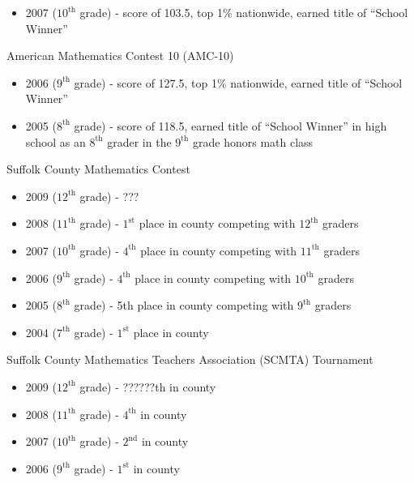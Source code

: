 \documentclass [11pt]{res}
\begin{document}
\begin {itemize}
{\begin{itemize}
          \item
            2007 ($10^\text{th}$ grade) - score of 103.5, top 1\% nationwide, earned title of ``School Winner''
        \end{itemize}
      \item
        American Mathematics Contest 10 (AMC-10)
        \begin{itemize}
          \item
            2006 ($9^\text{th}$ grade) - score of 127.5, top 1\% nationwide, earned title of ``School Winner''
          \item
            2005 ($8^\text{th}$ grade) - score of 118.5, earned title of ``School Winner'' in high school as an $8^\text{th}$ grader in the $9^\text{th}$ grade honors math class
        \end{itemize}
      \item
        Suffolk County Mathematics Contest
        \begin{itemize}
          \item
            2009 ($12^\text{th}$ grade) - ???
          \item
            2008 ($11^\text{th}$ grade) - $1^\text{st}$ place in county competing with $12^\text{th}$ graders
          \item
            2007 ($10^\text{th}$ grade) - $4^\text{th}$ place in county competing with $11^\text{th}$ graders
          \item
            2006 ($9^\text{th}$ grade) - $4^\text{th}$ place in county competing with $10^\text{th}$ graders
          \item
            2005 ($8^\text{th}$ grade) - 5th place in county competing with $9^\text{th}$ graders
          \item
            2004 ($7^\text{th}$ grade) - $1^\text{st}$ place in county
        \end{itemize}
      \item
        Suffolk County Mathematics Teachers Association (SCMTA) Tournament
        \begin{itemize}
          \item
            2009 ($12^\text{th}$ grade) - ??????th in county
          \item
            2008 ($11^\text{th}$ grade) - $4^\text{th}$ in county
          \item
            2007 ($10^\text{th}$ grade) - $2^\text{nd}$ in county
          \item
            2006 ($9^\text{th}$ grade) - $1^\text{st}$ in county

\end{itemize}}
\end{itemize}
\end{document}
